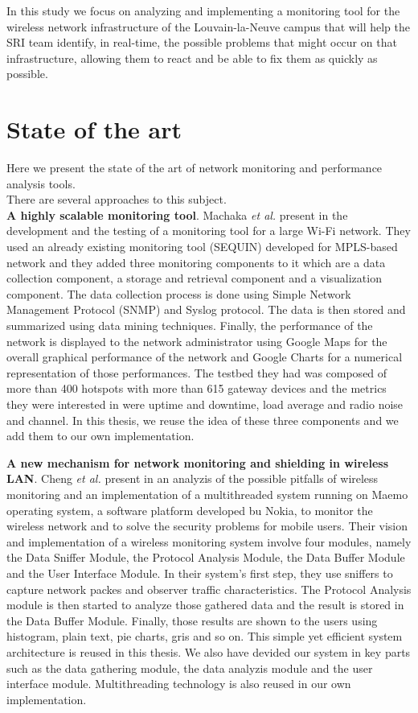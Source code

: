 In this study we focus on analyzing and implementing a monitoring tool for the wireless network infrastructure of the Louvain-la-Neuve campus that will help the SRI team identify, in real-time, the possible problems that might occur on that infrastructure, allowing them to react and be able to fix them as quickly as possible.


\section{State of the art}
Here we present the state of the art of network monitoring and performance analysis tools.\\
There are several approaches to this subject.\\

\textbf{A highly scalable monitoring tool}. Machaka \textit{et al.} present in \cite{article1} the development and the testing of a monitoring tool for a large Wi-Fi network. They used an already existing monitoring tool (SEQUIN) developed for MPLS-based network and they added three monitoring components to it which are a data collection component, a storage and retrieval component and a visualization component. The data collection process is done using Simple Network Management Protocol (SNMP) and Syslog protocol. The data is then stored and summarized using data mining techniques. Finally, the performance of the network is displayed to the network administrator using Google Maps for the overall graphical performance of the network and Google Charts for a numerical representation of those performances. The testbed they had was composed of more than 400 hotspots with more than 615 gateway devices and the metrics they were interested in were uptime and downtime, load average and radio noise and channel. In this thesis, we reuse the idea of these three components and we add them to our own implementation.

\textbf{A new mechanism for network monitoring and shielding in wireless LAN}. Cheng \textit{et al.} present in \cite{article2} an analyzis of the possible pitfalls of wireless monitoring and an implementation of a multithreaded system running on Maemo operating system, a software platform developed bu Nokia, to monitor the wireless network and to solve the security problems for mobile users. Their vision and implementation of a wireless monitoring system involve four modules, namely the Data Sniffer Module, the Protocol Analysis Module, the Data Buffer Module and the User Interface Module. In their system's first step, they use sniffers to capture network packes and observer traffic characteristics. The Protocol Analysis module is then started to analyze those gathered data and the result is stored in the Data Buffer Module. Finally, those results are shown to the users using histogram, plain text, pie charts, gris and so on. This simple yet efficient system architecture is reused in this thesis. We also have devided our system in key parts such as the data gathering module, the data analyzis module and the user interface module. Multithreading technology is also reused in our own implementation.





